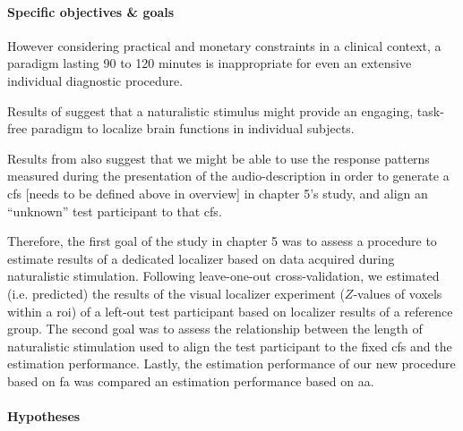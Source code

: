 






\paragraph{Specific objectives \& goals}

%
However considering practical and monetary constraints in a clinical context, a
paradigm lasting 90 to 120 minutes is inappropriate for even an extensive
individual diagnostic procedure.

Results of \citet{haeusler2022processing} suggest that a naturalistic stimulus
might provide an engaging, task-free paradigm to localize brain functions in
individual subjects.

%
Results from \citet{haeusler2022processing} also suggest that we might be able
to use the response patterns measured during the presentation of the
audio-description in order to generate a \ac{cfs} [needs to be defined above in
overview] in chapter 5's study, and align an ``unknown'' test participant to
that \ac{cfs}.


%
Therefore, the first goal of the study in chapter 5 was to assess a procedure to
estimate results of a dedicated localizer \citep{sengupta2016extension} based on
data acquired during naturalistic stimulation.
%
Following leave-one-out cross-validation, we estimated (i.e. predicted) the
results of the visual localizer experiment ($Z$-values of voxels within a
\ac{roi}) of a left-out test participant based on localizer results of a
reference group.
The second goal was to assess the relationship between the length of
naturalistic stimulation used to align the test participant to the fixed
\ac{cfs} and the estimation performance.
%
Lastly, the estimation performance of our new procedure based on \ac{fa} was
compared an estimation performance based on \ac{aa}.


\paragraph{Hypotheses}

